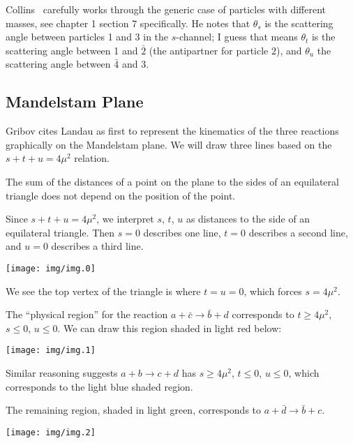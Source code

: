 \begin{remark}
Collins~\cite{Collins:1977jy} carefully works through the generic case
of particles with different masses, see chapter 1 section 7 specifically.
He notes that $\theta_{s}$ is the scattering angle between particles 1
and 3 in the $s$-channel; I guess that means $\theta_{t}$ is the
scattering angle between 1 and $\bar{2}$ (the antipartner for particle $2$),
and $\theta_{u}$ the scattering angle between $\bar{4}$ and $3$.
\end{remark}

\subsection{Mandelstam Plane}

\M
Gribov cites Landau as first to represent the kinematics of the three
reactions graphically on the Mandelstam plane. We will draw three lines
based on the $s+t+u=4\mu^{2}$ relation.

The sum of the distances of a point on the plane to the sides of an
equilateral triangle does not depend on the position of the point.

\M[1]
Since $s+t+u=4\mu^{2}$, we interpret $s$, $t$, $u$ as distances to the
side of an equilateral triangle. Then $s=0$ describes one line, $t=0$
describes a second line, and $u=0$ describes a third line.

\begin{center}
  \texttt{[image: img/img.0]}
\end{center}


We see the top vertex of the triangle is where $t=u=0$, which forces
$s=4\mu^{2}$.

\M
The ``physical region'' for the reaction $a+\bar{c}\to\bar{b}+d$
corresponds to $t\geq4\mu^{2}$, $s\leq0$, $u\leq0$. We can draw this
region shaded in light red below:

\begin{center}
  \texttt{[image: img/img.1]}
\end{center}

Similar reasoning suggests $a+b\to c+d$ has $s\geq4\mu^{2}$, $t\leq0$,
$u\leq0$, which corresponds to the light blue shaded region.

The remaining region, shaded in light green, corresponds to
$a+\bar{d}\to\bar{b}+c$.

\begin{center}
  \texttt{[image: img/img.2]}
\end{center}

